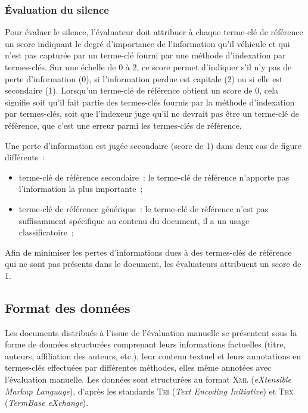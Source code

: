       \subsubsection{Évaluation du silence}
      \label{subsubsec:main-automatic_evaluation_of_keyphrase_annotation-methodology-evaluation_protocol-silence}
        Pour évaluer le silence, l'évaluateur doit attribuer à chaque terme-clé
        de référence un score indiquant le degré d'importance de l'information
        qu'il véhicule et qui n'est pas capturée par un terme-clé fourni par une
        méthode d'indexation par termes-clés. Sur une échelle de 0 à 2, ce score
        permet d'indiquer s'il n'y pas de perte d'information (0), si
        l'information perdue est capitale (2) ou si elle est secondaire (1).
        Lorsqu'un terme-clé de référence obtient un score de 0, cela signifie
        soit qu'il fait partie des termes-clés fournis par la méthode
        d'indexation par termes-clés, soit que l'indexeur juge qu'il ne devrait
        pas être un terme-clé de référence, que c'est une erreur parmi les
        termes-clés de référence.

        Une perte d'information est jugée secondaire (score de 1) dans deux
        cas de figure différents~:
        \begin{itemize}
          \item{terme-clé de référence secondaire~: le terme-clé de référence
                n'apporte pas l'information la plus importante~;}
          \item{terme-clé de référence générique~: le terme-clé de référence
                n'est pas suffisamment spécifique au contenu du document, il a
                un usage classificatoire~;}
        \end{itemize}
        Afin de minimiser les pertes d'informations dues à des termes-clés de
        référence qui ne sont pas présents dans le document, les évaluateurs
        attribuent un score de 1.



    \subsection{Format des données}
    \label{subsec:main-automatic_evaluation_of_keyphrase_annotation-methodology-data_format}
      Les documents distribués à l'issue de l'évaluation manuelle se présentent
      sous la forme de données structurées comprenant leurs
      informations factuelles (titre, auteurs, affiliation des auteurs, etc.),
      leur contenu textuel et leurs annotations en termes-clés effectuées par
      différentes méthodes, elles même annotées avec l'évaluation manuelle. Les
      données sont structurées au format \textsc{Xml} (\textit{eXtensible Markup
      Language}), d'après les standards \textsc{Tei} (\textit{Text Encoding
      Initiative}) et \textsc{Tbx} (\textit{TermBase eXchange}).

